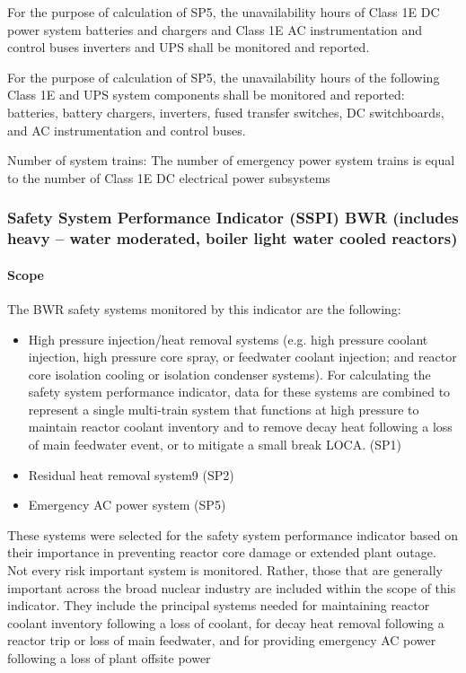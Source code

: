 For the purpose of calculation of SP5, the unavailability hours of
Class 1E DC power system batteries and chargers and Class 1E AC
instrumentation and control buses inverters and UPS shall be monitored
and reported.

For the purpose of calculation of SP5, the unavailability hours of the
following Class 1E and UPS system components shall be monitored and
reported: batteries, battery chargers, inverters, fused transfer
switches, DC switchboards, and AC instrumentation and control buses.

Number of system trains:  The number of emergency power system trains
is equal to the number of Class 1E DC electrical power subsystems


\subsubsection{Safety System Performance Indicator (SSPI) BWR (includes heavy – water
moderated, boiler light water cooled reactors)}

\paragraph{Scope}

The BWR safety systems monitored by this indicator are the following:
\begin{itemize}
\item High pressure injection/heat removal systems (e.g. high pressure coolant injection, high pressure core spray, or feedwater coolant injection; and reactor core isolation cooling or isolation condenser systems). For calculating the safety system performance indicator, data for these systems are combined to represent a single multi-train system that functions at high pressure to maintain reactor coolant inventory and to remove decay heat following a loss of main feedwater event, or to mitigate a small break LOCA. (SP1)
\item Residual heat removal system9 (SP2)
\item Emergency AC power system (SP5)
\end{itemize}

These systems were selected for the safety system performance
indicator based on their importance in preventing reactor core damage
or extended plant outage. Not every risk important system is
monitored. Rather, those that are generally important across the broad
nuclear industry are included within the scope of this indicator. They
include the principal systems needed for maintaining reactor coolant
inventory following a loss of coolant, for decay heat removal
following a reactor trip or loss of main feedwater, and for providing
emergency AC power following a loss of plant offsite power

